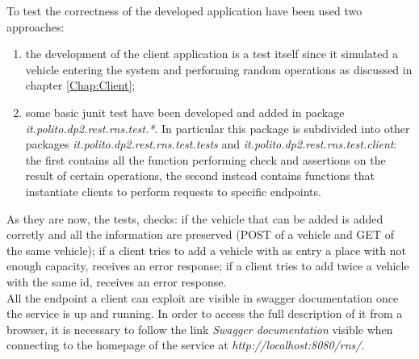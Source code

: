 To test the correctness of the developed application have been used two approaches:
\begin{enumerate}
  \item the development of the client application is a test itself since it simulated a vehicle entering the system and performing random operations as discussed in chapter \ref{Chap:Client};
  \item some basic junit test have been developed and added in package \textit{it.polito.dp2.rest.rns.test.*}. In particular this package is subdivided into other packages \textit{it.polito.dp2.rest.rns.test.tests} and \textit{it.polito.dp2.rest.rns.test.client}: the first contains all the function performing check and assertions on the result of certain operations, the second instead contains functions that instantiate clients to perform requests to specific endpoints.
\end{enumerate}
As they are now, the tests, checks: if the vehicle that can be added is added corretly and all the information are preserved (POST of a vehicle and GET of the same vehicle); if a client tries to add a vehicle with as entry a place with not enough capacity, receives an error response; if a client tries to add twice a vehicle with the same id, receives an error response.\\
All the endpoint a client can exploit are visible in swagger documentation once the service is up and running. In order to access the full description of it from a browser, it is necessary to follow the link \textit{Swagger documentation} visible when connecting to the homepage of the service at \textit{http://localhost:8080/rns/}.

